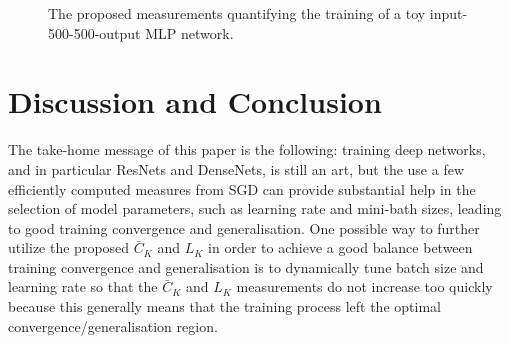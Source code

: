 \documentclass[10pt,journal,compsoc]{IEEEtran}
\begin{document}
\begin{figure*}
\begin{center}
\end{center}
\caption{The proposed measurements quantifying the training of a toy input-500-500-output MLP network.
}
\label{fig:toy_mnist_mlp}
\end{figure*}



\section{Discussion and Conclusion}

The take-home message of this paper is the following: training deep networks, and in particular ResNets and DenseNets, is still an art, but the use a few efficiently computed measures from SGD can provide substantial help in the selection of model parameters, such as learning rate and mini-bath sizes, leading to good training convergence and generalisation.
One possible way to further utilize the proposed $\bar{C}_K$ and $L_K$ in order to achieve a good balance between training convergence and generalisation is to dynamically tune batch size and learning rate so that the $\bar{C}_K$ and $L_K$ measurements do not increase too quickly because this generally means that the training process left the optimal convergence/generalisation region.
\end{document}

